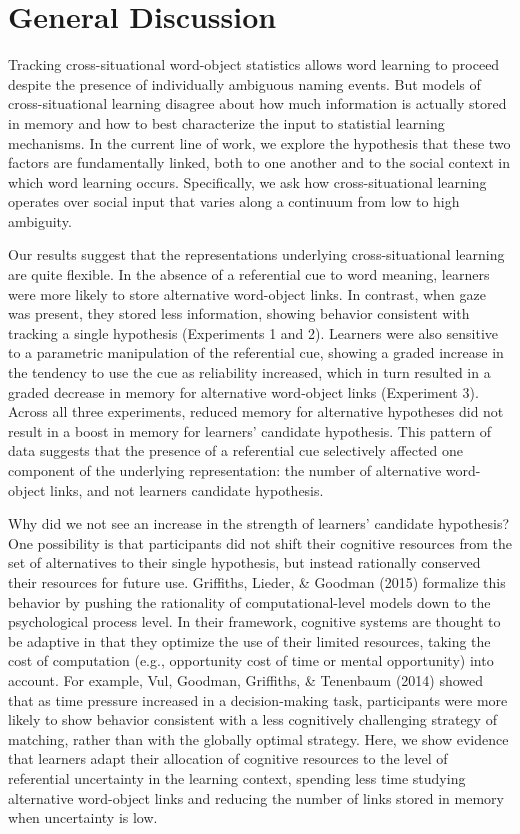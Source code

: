 \documentclass[authoryear, review]{elsarticle}
\begin{document}
\section{General Discussion}\label{general-discussion}

Tracking cross-situational word-object statistics allows word learning
to proceed despite the presence of individually ambiguous naming events.
But models of cross-situational learning disagree about how much
information is actually stored in memory and how to best characterize
the input to statistial learning mechanisms. In the current line of
work, we explore the hypothesis that these two factors are fundamentally
linked, both to one another and to the social context in which word
learning occurs. Specifically, we ask how cross-situational learning
operates over social input that varies along a continuum from low to
high ambiguity.

Our results suggest that the representations underlying
cross-situational learning are quite flexible. In the absence of a
referential cue to word meaning, learners were more likely to store
alternative word-object links. In contrast, when gaze was present, they
stored less information, showing behavior consistent with tracking a
single hypothesis (Experiments 1 and 2). Learners were also sensitive to
a parametric manipulation of the referential cue, showing a graded
increase in the tendency to use the cue as reliability increased, which
in turn resulted in a graded decrease in memory for alternative
word-object links (Experiment 3). Across all three experiments, reduced
memory for alternative hypotheses did not result in a boost in memory
for learners' candidate hypothesis. This pattern of data suggests that
the presence of a referential cue selectively affected one component of
the underlying representation: the number of alternative word-object
links, and not learners candidate hypothesis.

Why did we not see an increase in the strength of learners' candidate
hypothesis? One possibility is that participants did not shift their
cognitive resources from the set of alternatives to their single
hypothesis, but instead rationally conserved their resources for future
use. Griffiths, Lieder, \& Goodman (2015) formalize this behavior by
pushing the rationality of computational-level models down to the
psychological process level. In their framework, cognitive systems are
thought to be adaptive in that they optimize the use of their limited
resources, taking the cost of computation (e.g., opportunity cost of
time or mental opportunity) into account. For example, Vul, Goodman,
Griffiths, \& Tenenbaum (2014) showed that as time pressure increased in
a decision-making task, participants were more likely to show behavior
consistent with a less cognitively challenging strategy of matching,
rather than with the globally optimal strategy. Here, we show evidence
that learners adapt their allocation of cognitive resources to the level
of referential uncertainty in the learning context, spending less time
studying alternative word-object links and reducing the number of links
stored in memory when uncertainty is low.
\end{document}
